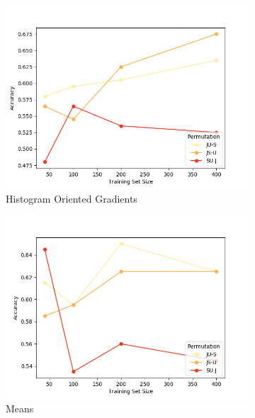 \begin{figure}[ht]
  \centering
    \begin{subfigure}{.49\textwidth}
        \includegraphics[width=\textwidth]{images/classic-hog.png}
        \caption{Histogram Oriented Gradients}
    \end{subfigure}
    \begin{subfigure}{.49\textwidth}
        \includegraphics[width=\textwidth]{images/classic-means.png}
        \caption{Means}
    \end{subfigure}
    \begin{subfigure}{.49\textwidth}

\end{subfigure}
\end{figure}
